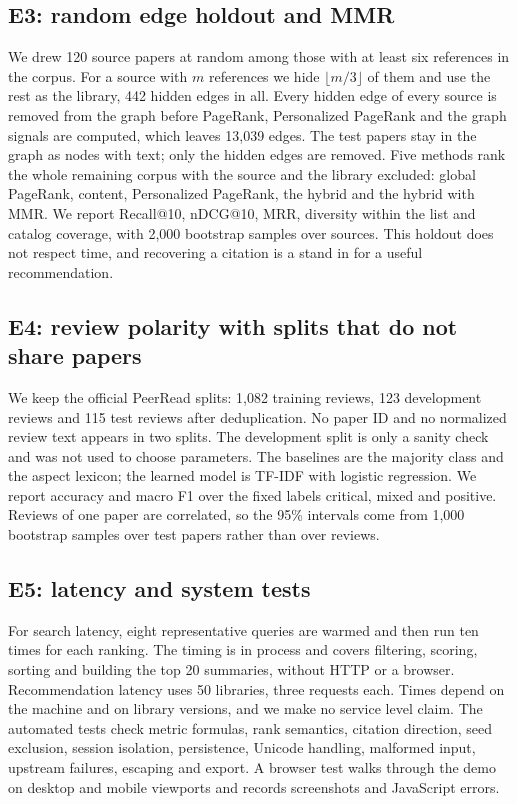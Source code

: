 \documentclass[11pt,a4paper]{article}
\begin{document}
\subsection{E3: random edge holdout and MMR}
We drew 120 source papers at random among those with at least six references in the corpus. For a source with $m$ references we hide $\lfloor m/3\rfloor$ of them and use the rest as the library, 442 hidden edges in all. Every hidden edge of every source is removed from the graph before PageRank, Personalized PageRank and the graph signals are computed, which leaves 13,039 edges. The test papers stay in the graph as nodes with text; only the hidden edges are removed. Five methods rank the whole remaining corpus with the source and the library excluded: global PageRank, content, Personalized PageRank, the hybrid and the hybrid with MMR. We report Recall@10, nDCG@10, MRR, diversity within the list and catalog coverage, with 2,000 bootstrap samples over sources. This holdout does not respect time, and recovering a citation is a stand in for a useful recommendation.

\subsection{E4: review polarity with splits that do not share papers}
We keep the official PeerRead splits: 1,082 training reviews, 123 development reviews and 115 test reviews after deduplication. No paper ID and no normalized review text appears in two splits. The development split is only a sanity check and was not used to choose parameters. The baselines are the majority class and the aspect lexicon; the learned model is TF-IDF with logistic regression. We report accuracy and macro F1 over the fixed labels critical, mixed and positive. Reviews of one paper are correlated, so the 95\% intervals come from 1,000 bootstrap samples over test papers rather than over reviews.

\subsection{E5: latency and system tests}
For search latency, eight representative queries are warmed and then run ten times for each ranking. The timing is in process and covers filtering, scoring, sorting and building the top 20 summaries, without HTTP or a browser. Recommendation latency uses 50 libraries, three requests each. Times depend on the machine and on library versions, and we make no service level claim. The automated tests check metric formulas, rank semantics, citation direction, seed exclusion, session isolation, persistence, Unicode handling, malformed input, upstream failures, escaping and export. A browser test walks through the demo on desktop and mobile viewports and records screenshots and JavaScript errors.
\end{document}
